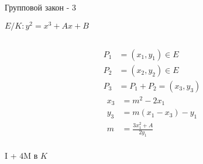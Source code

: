 \documentclass{beamer}
\begin{document}
\begin{frame}{Групповой закон - 3}%
    \begin{center}
        $E/K: y^2 = x^3 + Ax + B$
    \end{center}
    \begin{columns}
        \begin{column}{0.5\textwidth}
            \begin{equation*}
                \begin{split}
                    P_1 &= (x_1, y_1) \in E \\
                    P_2 &= (x_2, y_2) \in E \\
                    P_3 &= P_1 + P_2 = \left(x_3, y_3\right)
                \end{split}
            \end{equation*}
            \begin{equation*}
                \begin{split}
                x_3 &= m^2 - 2 x_1 \\
                y_3 &= m\left( x_1 - x_3 \right) - y_1\\
                m   &= \frac{3x_1^2 + A}{2 y_1} \\ 
                \end{split}
            \end{equation*}
            \begin{center}
                \begin{tcolorbox}[enhanced,hbox,colback=box-blue-color!15,colframe=box-blue-color,title=Сложность,center title]
                    \begin{varwidth}{\textwidth}
                        \begin{center}
                            I + $4$M в $K$
                        \end{center}
                    \end{varwidth}
                \end{tcolorbox}	
            \end{center}
            

\end{column}
\end{columns}
\end{frame}
\end{document}
